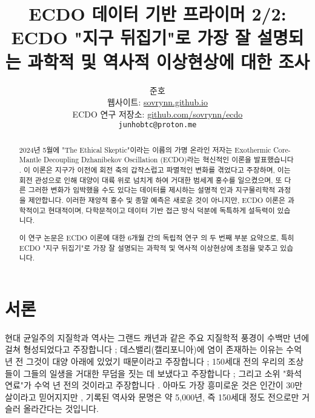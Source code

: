 \documentclass[10pt,twocolumn,letterpaper]{article}
\begin{document}
\title{ECDO 데이터 기반 프라이머 2/2: ECDO "지구 뒤집기"로 가장 잘 설명되는 과학적 및 역사적 이상현상에 대한 조사}

\author{준호\\
웹사이트: \href{https://sovrynn.github.io}{sovrynn.github.io}\\
ECDO 연구 저장소: \href{https://github.com/sovrynn/ecdo}{github.com/sovrynn/ecdo}\\
{\tt\small junhobtc@proton.me}
}

\maketitle

\begin{abstract}
2024년 5월에 "The Ethical Skeptic"이라는 이름의 가명 온라인 저자는 Exothermic Core-Mantle Decoupling Dzhanibekov Oscillation (ECDO)라는 혁신적인 이론을 발표했습니다 \cite{0} \cite{1}. 이 이론은 지구가 이전에 회전 축의 갑작스럽고 파멸적인 변화를 겪었다고 주장하며, 이는 회전 관성으로 인해 대양이 대륙 위로 넘치게 하여 거대한 범세계 홍수를 일으켰으며, 또 다른 그러한 변화가 임박했을 수도 있다는 데이터를 제시하는 설명적 인과 지구물리학적 과정을 제안합니다. 이러한 재앙적 홍수 및 종말 예측은 새로운 것이 아니지만, ECDO 이론은 과학적이고 현대적이며, 다학문적이고 데이터 기반 접근 방식 덕분에 독특하게 설득력이 있습니다.

이 연구 논문은 ECDO 이론에 대한 6개월 간의 독립적 연구 \cite{2,20}의 두 번째 부분 요약으로, 특히 ECDO "지구 뒤집기"로 가장 잘 설명되는 과학적 및 역사적 이상현상에 초점을 맞추고 있습니다.

\end{abstract}


\section{서론}

현대 균일주의 지질학과 역사는 그랜드 캐년과 같은 주요 지질학적 풍경이 수백만 년에 걸쳐 형성되었다고 주장합니다 \cite{143}; 데스밸리(캘리포니아)에 염이 존재하는 이유는 수억 년 전 그것이 대양 아래에 있었기 때문이라고 주장합니다 \cite{144}; 150세대 전의 우리의 조상들이 그들의 일생을 거대한 무덤을 짓는 데 보냈다고 주장합니다 \cite{29,70}; 그리고 소위 "화석 연료"가 수억 년 전의 것이라고 주장합니다 \cite{104}. 아마도 가장 흥미로운 것은 인간이 30만 살이라고 믿어지지만 \cite{145}, 기록된 역사와 문명은 약 5,000년, 즉 150세대 정도 전으로만 거슬러 올라간다는 것입니다.
\end{document}
